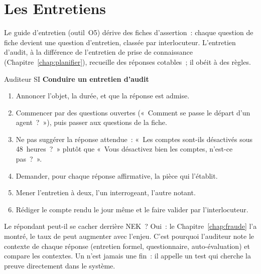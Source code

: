\section{Les Entretiens}
\label{sec:c10-entretiens}

Le guide d'entretien (outil~O5) dérive des fiches d'assertion~: chaque
question de fiche devient une question d'entretien, classée par
interlocuteur. L'entretien d'audit, à la différence de l'entretien de prise
de connaissance (Chapitre~\ref{chap:planifier}), recueille des réponses
cotables~; il obéit à des règles.

\begin{boxmetier}{Auditeur SI}
\textbf{Conduire un entretien d'audit}
\begin{enumerate}
    \item Annoncer l'objet, la durée, et que la réponse \NEK{} est admise.
    \item Commencer par des questions ouvertes («~Comment se passe le départ
          d'un agent~?~»), puis passer aux questions de la fiche.
    \item Ne pas suggérer la réponse attendue~: «~Les comptes sont-ils
          désactivés sous 48~heures~?~» plutôt que «~Vous désactivez bien
          les comptes, n'est-ce pas~?~».
    \item Demander, pour chaque réponse affirmative, la pièce qui l'établit.
    \item Mener l'entretien à deux, l'un interrogeant, l'autre notant.
    \item Rédiger le compte rendu le jour même et le faire valider par
          l'interlocuteur.
\end{enumerate}
\end{boxmetier}

\begin{boiteRemarque}{Le répondant peut-il se cacher derrière NEK~?}
Oui~: le Chapitre~\ref{chap:fraude} l'a montré, le taux de \NEK{} peut
augmenter avec l'enjeu. C'est pourquoi l'auditeur note le contexte de
chaque réponse (entretien formel, questionnaire, auto-évaluation) et
compare les contextes. Un \NEK{} n'est jamais une fin~: il appelle un test
qui cherche la preuve directement dans le système.
\end{boiteRemarque}

